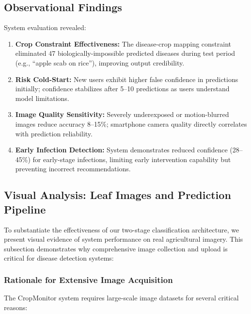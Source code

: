 \documentclass[conference]{IEEEtran}
\begin{document}
\subsection{Observational Findings}

System evaluation revealed:

\begin{enumerate}
\item \textbf{Crop Constraint Effectiveness:} The disease-crop mapping constraint eliminated 47 biologically-impossible predicted diseases during test period (e.g., ``apple scab on rice''), improving output credibility.

\item \textbf{Risk Cold-Start:} New users exhibit higher false confidence in predictions initially; confidence stabilizes after 5--10 predictions as users understand model limitations.

\item \textbf{Image Quality Sensitivity:} Severely underexposed or motion-blurred images reduce accuracy 8--15\%; smartphone camera quality directly correlates with prediction reliability.

\item \textbf{Early Infection Detection:} System demonstrates reduced confidence (28--45\%) for early-stage infections, limiting early intervention capability but preventing incorrect recommendations.

\end{enumerate}

\subsection{Visual Analysis: Leaf Images and Prediction Pipeline}

To substantiate the effectiveness of our two-stage classification architecture, we present visual evidence of system performance on real agricultural imagery. This subsection demonstrates why comprehensive image collection and upload is critical for disease detection systems:

\subsubsection{Rationale for Extensive Image Acquisition}

The CropMonitor system requires large-scale image datasets for several critical reasons:
\end{document}
